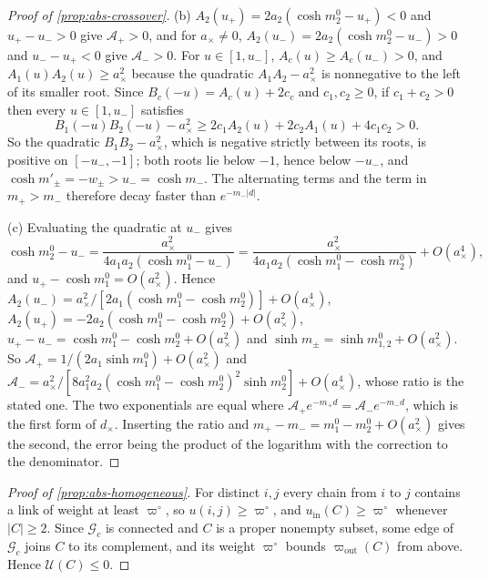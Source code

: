 \begin{proof}[Proof of \cref{prop:abs-crossover}]
(b) $A_2(u_+)=2a_2(\cosh m^0_2-u_+)<0$ and $u_+-u_->0$ give $\mathcal A_+>0$, and for $a_\times\ne0$, $A_2(u_-)=2a_2(\cosh m^0_2-u_-)>0$ and $u_--u_+<0$ give $\mathcal A_->0$. For $u\in[1,u_-]$, $A_c(u)\ge A_c(u_-)>0$, and $A_1(u)A_2(u)\ge a_\times^2$ because the quadratic $A_1A_2-a_\times^2$ is nonnegative to the left of its smaller root. Since $B_c(-u)=A_c(u)+2c_c$ and $c_1,c_2\ge0$, if $c_1+c_2>0$ then every $u\in[1,u_-]$ satisfies
\[
B_1(-u)B_2(-u)-a_\times^2\ge2c_1A_2(u)+2c_2A_1(u)+4c_1c_2>0.
\]
So the quadratic $B_1B_2-a_\times^2$, which is negative strictly between its roots, is positive on $[-u_-,-1]$; both roots lie below $-1$, hence below $-u_-$, and $\cosh m'_\pm=-w_\pm>u_-=\cosh m_-$. The alternating terms and the term in $m_+>m_-$ therefore decay faster than $e^{-m_-\lvert d\rvert}$.

(c) Evaluating the quadratic at $u_-$ gives
\[
\cosh m^0_2-u_-=\frac{a_\times^2}{4a_1a_2(\cosh m^0_1-u_-)}=\frac{a_\times^2}{4a_1a_2(\cosh m^0_1-\cosh m^0_2)}+O(a_\times^4),
\]
and $u_+-\cosh m^0_1=O(a_\times^2)$. Hence $A_2(u_-)=a_\times^2/[2a_1(\cosh m^0_1-\cosh m^0_2)]+O(a_\times^4)$, $A_2(u_+)=-2a_2(\cosh m^0_1-\cosh m^0_2)+O(a_\times^2)$, $u_+-u_-=\cosh m^0_1-\cosh m^0_2+O(a_\times^2)$ and $\sinh m_\pm=\sinh m^0_{1,2}+O(a_\times^2)$. So $\mathcal A_+=1/(2a_1\sinh m^0_1)+O(a_\times^2)$ and $\mathcal A_-=a_\times^2/[8a_1^2a_2(\cosh m^0_1-\cosh m^0_2)^2\sinh m^0_2]+O(a_\times^4)$, whose ratio is the stated one. The two exponentials are equal where $\mathcal A_+e^{-m_+d}=\mathcal A_-e^{-m_-d}$, which is the first form of $d_\times$. Inserting the ratio and $m_+-m_-=m^0_1-m^0_2+O(a_\times^2)$ gives the second, the error being the product of the logarithm with the correction to the denominator.
\end{proof}

\begin{proof}[Proof of \cref{prop:abs-homogeneous}]
For distinct $i,j$ every chain from $i$ to $j$ contains a link of weight at least $\varpi^\circ$, so $u(i,j)\ge\varpi^\circ$, and $u_{\mathrm{in}}(C)\ge\varpi^\circ$ whenever $\lvert C\rvert\ge2$. Since $\mathcal G_c$ is connected and $C$ is a proper nonempty subset, some edge of $\mathcal G_c$ joins $C$ to its complement, and its weight $\varpi^\circ$ bounds $\varpi_{\mathrm{out}}(C)$ from above. Hence $\mathcal U(C)\le0$.
\end{proof}

